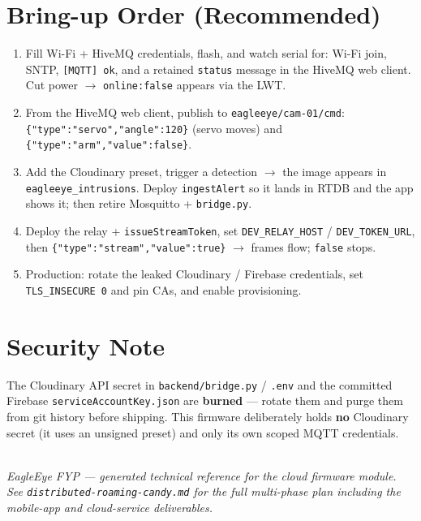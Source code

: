 \documentclass[11pt,a4paper]{article}
\newcommand{\code}[1]{\texttt{#1}}
\begin{document}
\section{Bring-up Order (Recommended)}
\begin{enumerate}[leftmargin=1.5em]
  \item Fill Wi-Fi + HiveMQ credentials, flash, and watch serial for: Wi-Fi join, SNTP,
        \code{[MQTT] ok}, and a retained \code{status} message in the HiveMQ web client.
        Cut power $\rightarrow$ \code{online:false} appears via the LWT.
  \item From the HiveMQ web client, publish to \code{eagleeye/cam-01/cmd}:
        \code{\{"type":"servo","angle":120\}} (servo moves) and \code{\{"type":"arm","value":false\}}.
  \item Add the Cloudinary preset, trigger a detection $\rightarrow$ the image appears in
        \code{eagleeye\_intrusions}. Deploy \code{ingestAlert} so it lands in RTDB and the app
        shows it; then retire Mosquitto + \code{bridge.py}.
  \item Deploy the relay + \code{issueStreamToken}, set \code{DEV\_RELAY\_HOST} /
        \code{DEV\_TOKEN\_URL}, then \code{\{"type":"stream","value":true\}} $\rightarrow$ frames
        flow; \code{false} stops.
  \item Production: rotate the leaked Cloudinary / Firebase credentials, set
        \code{TLS\_INSECURE 0} and pin CAs, and enable provisioning.
\end{enumerate}

\section{Security Note}
The Cloudinary API secret in \code{backend/bridge.py} / \code{.env} and the committed Firebase
\code{serviceAccountKey.json} are \textbf{burned} --- rotate them and purge them from git history
before shipping. This firmware deliberately holds \textbf{no} Cloudinary secret (it uses an
unsigned preset) and only its own scoped MQTT credentials.

\vspace{1.2em}
\noindent{\color{rulegray}\rule{\linewidth}{0.4pt}}\\
{\small\itshape\color{eaglegray} EagleEye FYP --- generated technical reference for the cloud
firmware module. See \code{distributed-roaming-candy.md} for the full multi-phase plan including
the mobile-app and cloud-service deliverables.}
\end{document}
